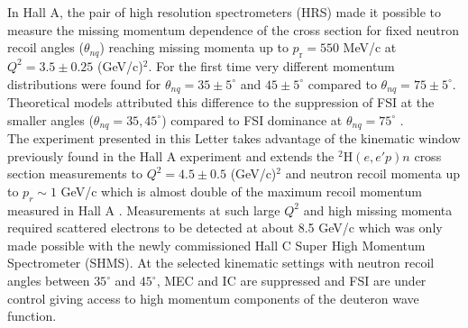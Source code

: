 \indent In Hall A, the pair of high resolution spectrometers (HRS) made it possible to measure the missing momentum dependence of the cross section for fixed neutron recoil angles ($\theta_{nq}$) reaching missing momenta up to $p_{\mathrm{r}}=550$ MeV/c at $Q^{2}=3.5\pm0.25$ (GeV/c)$^{2}$. For the first time very different momentum distributions were found for $\theta_{nq}=35\pm5^{\circ}$
and $45\pm5^{\circ}$ compared to  $\theta_{nq}=75\pm5^{\circ}$. Theoretical models attributed this difference  to the suppression of FSI at the smaller angles ($\theta_{nq}=35, 45^{\circ}$) compared to FSI
dominance at $\theta_{nq}=75^{\circ}$ \cite{PhysRevLett.107.262501}. \\
\indent The experiment presented in this Letter takes advantage of the kinematic window previously found in the Hall A experiment and extends the $^{2}\mathrm{H}(e,e'p)n$ cross section measurements
to $Q^{2}=4.5\pm0.5$ (GeV/c)$^{2}$ and neutron recoil momenta up to $p_{r}\sim 1$ GeV/c which is almost double of the maximum recoil momentum measured in Hall A \cite{PhysRevLett.107.262501}.
Measurements at such large $Q^{2}$ and high missing momenta required scattered electrons to be detected at about 8.5 GeV/c which was only made possible with the newly commissioned Hall C Super High Momentum Spectrometer (SHMS).
At the selected kinematic settings with neutron recoil angles between $35^{\circ}$ and $45^{\circ}$, MEC and IC are suppressed and FSI are under control giving access to high momentum components of the deuteron wave function.


